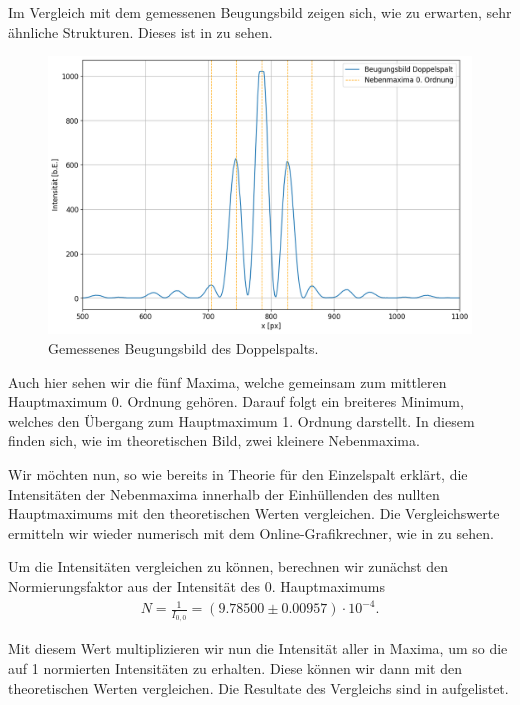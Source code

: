 Im Vergleich mit dem gemessenen Beugungsbild zeigen sich, wie zu erwarten, sehr ähnliche Strukturen. Dieses ist in  zu sehen.

\begin{figure}[H]
  \centering
  \includegraphics[width=.9\textwidth]{files/plots/3/ds_gemessen_beugungsbild.png}
  \caption{Gemessenes Beugungsbild des Doppelspalts.}
  \label{fig:ds_gemessen_beugungsbild}
\end{figure}

Auch hier sehen wir die fünf Maxima, welche gemeinsam zum mittleren Hauptmaximum 0. Ordnung gehören. Darauf folgt ein breiteres Minimum, welches den Übergang zum Hauptmaximum 1. Ordnung darstellt. In diesem finden sich, wie im theoretischen Bild, zwei kleinere Nebenmaxima.

Wir möchten nun, so wie bereits in Theorie für den Einzelspalt erklärt, die Intensitäten der Nebenmaxima innerhalb der Einhüllenden des nullten Hauptmaximums mit den theoretischen Werten vergleichen. Die Vergleichswerte ermitteln wir wieder numerisch mit dem Online-Grafikrechner, wie in  zu sehen.

Um die Intensitäten vergleichen zu können, berechnen wir zunächst den Normierungsfaktor aus der Intensität des 0. Hauptmaximums
\begin{align}
  N = \frac{1}{I_{0,0}} = (9.78500 \pm 0.00957) \cdot 10^{-4}.
\end{align}

Mit diesem Wert multiplizieren wir nun die Intensität aller in  Maxima, um so die auf 1 normierten Intensitäten zu erhalten. Diese können wir dann mit den theoretischen Werten vergleichen. Die Resultate des Vergleichs sind in  aufgelistet.


